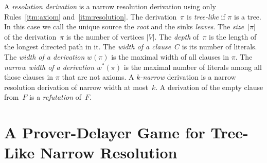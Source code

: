 \documentclass[a4paper,english, thm-restate]{lipics-v2021}
\newcommand{\defining}[1]{\emph{#1}}
\begin{document}
\noindent A \defining{resolution derivation} is a narrow resolution derivation using only Rules~\ref{itm:axiom} and~\ref{itm:resolution}.
The derivation~$\pi$ is \defining{tree-like} if $\pi$ is a tree. In this case we call the unique source the \defining{root} and the sinks \defining{leaves}. 
The \defining{size}~$|\pi|$ of the derivation~$\pi$
is the number of vertices $|V|$.
The \defining{depth} of~$\pi$ is the length of the longest directed path in it.
The \defining{width of a clause}~$C$ is its number of literals.
The \defining{width of a derivation} $w(\pi)$ is the maximal width of all clauses in $\pi$.
The \defining{narrow width of a derivation} $w^{\ast}(\pi)$ is the maximal number of literals among all those clauses in $\pi$ that are not axioms.
A \defining{$k$-narrow} derivation is a narrow resolution derivation of narrow width at most~$k$.
A derivation of the empty clause from~$F$ is a \defining{refutation} of~$F$.




%
%
%
%
         
        \section{A Prover-Delayer Game for Tree-Like Narrow Resolution} \label{sec: Prover}
\end{document}
